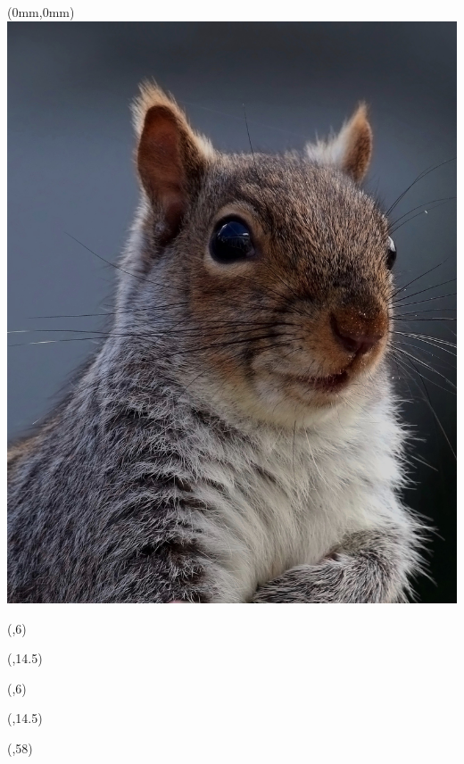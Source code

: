 \begin{textblock*}{\paperwidth}(0mm,0mm)
  \includegraphics[width=\paperwidth,%
                   keepaspectratio=true]{images/Sciurus_carolinensis}
\end{textblock*}

\begin{textblock*}{0.75\textwidth}(\TPHorizModule,6\TPVertModule)
  \textcolor{black!10}{\titlefmt}
\end{textblock*}

\begin{textblock*}{0.75\textwidth}(\TPHorizModule,14.5\TPVertModule)
  \textcolor{black!10}{\authorsfmt}
\end{textblock*}

\null\cleardoublepage


\begin{textblock*}{0.75\textwidth}(\TPHorizModule,6\TPVertModule)
  \titlefmt
\end{textblock*}

\begin{textblock*}{\textwidth}(\TPHorizModule,14.5\TPVertModule)
  \affiliations
\end{textblock*}

\begin{textblock*}{\textwidth}(\TPHorizModule,58\TPVertModule)
  \edition
\end{textblock*}
\endgroup

